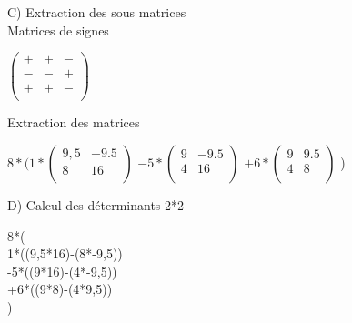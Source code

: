 \vspace{10mm} %

C) Extraction des sous matrices \\

\vspace{5mm} %
Matrices de signes \\

\vspace{5mm} %

$
\begin{pmatrix}
  + & + & - \\
  - & - & + \\
  + & + & - \\
\end{pmatrix}
$


\vspace{10mm} %
Extraction des matrices \\
\vspace{5mm} %

$
8*(
  1*
  \begin{pmatrix}
    9,5 & -9.5 \\
    8 & 16 \\
  \end{pmatrix}
  $
  $
  -5*
  \begin{pmatrix}
    9 & -9.5 \\
    4 & 16 \\
  \end{pmatrix}
  $
  $
  +6*
  \begin{pmatrix}
    9 & 9.5 \\
    4 & 8 \\
  \end{pmatrix}
  $
)

\newpage

D) Calcul des déterminants 2*2


\vspace{5mm} %

8*(\\

1*((9,5*16)-(8*-9,5))\\

-5*((9*16)-(4*-9,5))\\

+6*((9*8)-(4*9,5))\\

)

\vspace{10mm} %

